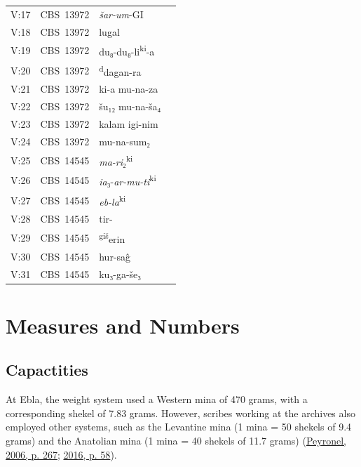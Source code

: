 \documentclass[
]{book}
\begin{document}
\begin{longtable}[]{@{}llll@{}}
\toprule\noalign{}
\endhead
\bottomrule\noalign{}
\endlastfoot
V:17 & CBS~13972 & \emph{šar-um}-GI & \\
V:18 & CBS~13972 & lugal & \\
V:19 & CBS~13972 & du₈-du₈-li\textsuperscript{ki}-a & \\
V:20 & CBS~13972 & \textsuperscript{d}dagan-ra & \\
V:21 & CBS~13972 & ki-a mu-na-za & \\
V:22 & CBS~13972 & šu₁₂ mu-na-ša₄ & \\
V:23 & CBS~13972 & kalam igi-nim & \\
V:24 & CBS~13972 & mu-na-sum₂ & \\
V:25 & CBS~14545 & \emph{ma-ri}₂\textsuperscript{ki} & \\
V:26 & CBS~14545 & \emph{ia}₃-\emph{ar-mu-ti}\textsuperscript{ki} & \\
V:27 & CBS~14545 & \emph{eb-la}\textsuperscript{ki} & \\
V:28 & CBS~14545 & tir- & \\
V:29 & CBS~14545 & \textsuperscript{giš}erin & \\
V:30 & CBS~14545 & hur-saĝ & \\
V:31 & CBS~14545 & ku₃-ga-še₃ & \\
\end{longtable}

\hypertarget{measures-and-numbers}{%
\chapter{Measures and Numbers}\label{measures-and-numbers}}

\hypertarget{capactities}{%
\section{Capactities}\label{capactities}}

At Ebla, the weight system used a Western mina of 470 grams, with a corresponding shekel of 7.83 grams. However, scribes working at the archives also employed other systems, such as the Levantine mina (1 mina = 50 shekels of 9.4 grams) and the Anatolian mina (1 mina = 40 shekels of 11.7 grams) (\protect\hyperlink{ref-Peyronel2006}{Peyronel, 2006, p. 267}; \protect\hyperlink{ref-Peyronel2016}{2016, p. 58}).
\end{document}
